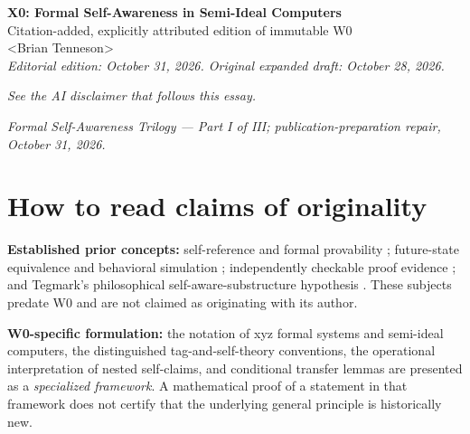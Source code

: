 \documentclass[11pt,letterpaper]{article}
\newcommand{\AuthorExact}{\textless Brian Tenneson\textgreater}
\begin{document}
\begin{center}
{\LARGE\bfseries X0: Formal Self-Awareness in Semi-Ideal Computers}\\[8pt]
{\large Citation-added, explicitly attributed edition of immutable W0}\\[7pt]
\AuthorExact\\[7pt]
\textit{Editorial edition: October 31, 2026. Original expanded draft: October 28, 2026.}
\end{center}
\par\noindent\emph{See the AI disclaimer that follows this essay.}\par\medskip
\noindent{}\par\medskip
\noindent\textit{Formal Self-Awareness Trilogy --- Part I of III; publication-preparation repair, October 31, 2026.}\par\medskip
\section*{How to read claims of originality}
\textbf{Established prior concepts:} self-reference and formal provability \cite{godel,lob,feferman}; future-state equivalence and behavioral simulation \cite{nerode,milner}; independently checkable proof evidence \cite{necula,besson}; and Tegmark's philosophical self-aware-substructure hypothesis \cite{tegmark}. These subjects predate W0 and are not claimed as originating with its author.

\textbf{W0-specific formulation:} the notation of xyz formal systems and semi-ideal computers, the distinguished tag-and-self-theory conventions, the operational interpretation of nested self-claims, and conditional transfer lemmas are presented as a \emph{specialized framework}. A mathematical proof of a statement in that framework does not certify that the underlying general principle is historically new.
\end{document}
